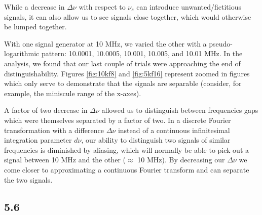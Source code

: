 \documentclass[a4paper]{article}
\begin{document}
While a decrease in $\Delta \nu$ with respect to $\nu_s$ can introduce unwanted/fictitious signals, it can also allow us to see signals close together, which would otherwise be lumped together.

With one signal generator at 10 MHz, we varied the other with a pseudo-logarithmic pattern: 10.0001, 10.0005, 10.001, 10.005, and 10.01 MHz. In the analysis, we found that our last couple of trials were approaching the end of distinguishability. Figures \ref{fig:10kf8} and \ref{fig:5kf16} represent zoomed in figures which only serve to demonstrate that the signals are separable (consider, for example, the miniscule range of the x-axes).

A factor of two decrease in $\Delta \nu$ allowed us to distinguish between frequencies gaps which were themselves separated by a factor of two. In a discrete Fourier transformation with a difference $\Delta \nu$ instead of a continuous infinitesimal integration parameter $d\nu$, our ability to distinguish two signals of similar frequencies is diminished by aliasing, which will normally be able to pick out a signal between 10 MHz and the other ($\approx$ 10 MHz). By decreasing our $\Delta \nu$ we come closer to approximating a continuous Fourier transform and can separate the two signals.


\subsection{5.6}
\end{document}
